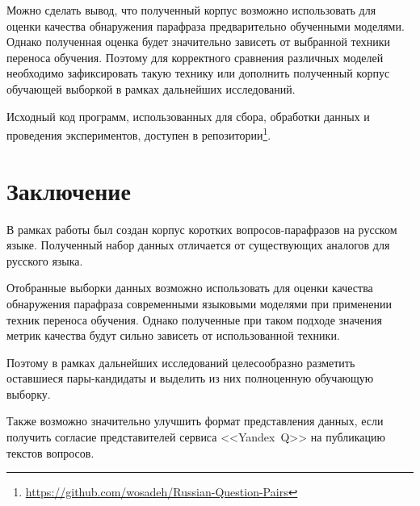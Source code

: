 \documentclass[a4paper,14pt]{extarticle}
\begin{document}
    Можно сделать вывод, что полученный корпус возможно использовать для оценки качества обнаружения парафраза предварительно обученными моделями.
    Однако полученная оценка будет значительно зависеть от выбранной техники переноса обучения.
    Поэтому для корректного сравнения различных моделей необходимо зафиксировать такую технику или дополнить полученный корпус обучающей выборкой в рамках дальнейших исследований.
    
    Исходный код программ, использованных для сбора, обработки данных и проведения экспериментов, доступен в репозитории\footnote{\url{https://github.com/wosadeh/Russian-Question-Pairs}}.
\section{Заключение}
В рамках работы был создан корпус коротких вопросов-парафразов на русском языке.
Полученный набор данных отличается от существующих аналогов для русского языка.

Отобранные выборки данных возможно использовать для оценки качества обнаружения парафраза современными языковыми моделями при применении техник переноса обучения.
Однако полученные при таком подходе значения метрик качества будут сильно зависеть от использованной техники.

Поэтому в рамках дальнейших исследований целесообразно разметить оставшиеся пары-кандидаты и выделить из них полноценную обучающую выборку.

Также возможно значительно улучшить формат представления данных, если получить согласие представителей сервиса \mbox{<<Yandex Q>>} на публикацию текстов вопросов.

\printbibliography[title={Список литературы (или источников)}]
\end{document}
